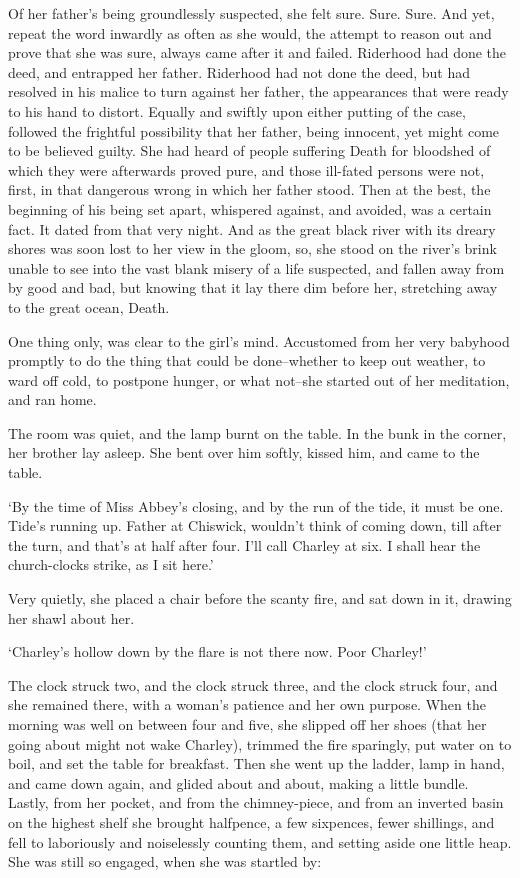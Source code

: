 Of her father’s being groundlessly suspected, she felt sure. Sure. Sure.
And yet, repeat the word inwardly as often as she would, the attempt to
reason out and prove that she was sure, always came after it and failed.
Riderhood had done the deed, and entrapped her father. Riderhood had
not done the deed, but had resolved in his malice to turn against her
father, the appearances that were ready to his hand to distort. Equally
and swiftly upon either putting of the case, followed the frightful
possibility that her father, being innocent, yet might come to be
believed guilty. She had heard of people suffering Death for bloodshed
of which they were afterwards proved pure, and those ill-fated persons
were not, first, in that dangerous wrong in which her father stood. Then
at the best, the beginning of his being set apart, whispered against,
and avoided, was a certain fact. It dated from that very night. And as
the great black river with its dreary shores was soon lost to her view
in the gloom, so, she stood on the river’s brink unable to see into the
vast blank misery of a life suspected, and fallen away from by good and
bad, but knowing that it lay there dim before her, stretching away to
the great ocean, Death.

One thing only, was clear to the girl’s mind. Accustomed from her very
babyhood promptly to do the thing that could be done--whether to keep
out weather, to ward off cold, to postpone hunger, or what not--she
started out of her meditation, and ran home.

The room was quiet, and the lamp burnt on the table. In the bunk in the
corner, her brother lay asleep. She bent over him softly, kissed him,
and came to the table.

‘By the time of Miss Abbey’s closing, and by the run of the tide, it
must be one. Tide’s running up. Father at Chiswick, wouldn’t think of
coming down, till after the turn, and that’s at half after four. I’ll
call Charley at six. I shall hear the church-clocks strike, as I sit
here.’

Very quietly, she placed a chair before the scanty fire, and sat down in
it, drawing her shawl about her.

‘Charley’s hollow down by the flare is not there now. Poor Charley!’

The clock struck two, and the clock struck three, and the clock struck
four, and she remained there, with a woman’s patience and her own
purpose. When the morning was well on between four and five, she slipped
off her shoes (that her going about might not wake Charley), trimmed
the fire sparingly, put water on to boil, and set the table for
breakfast. Then she went up the ladder, lamp in hand, and came down
again, and glided about and about, making a little bundle. Lastly, from
her pocket, and from the chimney-piece, and from an inverted basin
on the highest shelf she brought halfpence, a few sixpences, fewer
shillings, and fell to laboriously and noiselessly counting them, and
setting aside one little heap. She was still so engaged, when she was
startled by:


